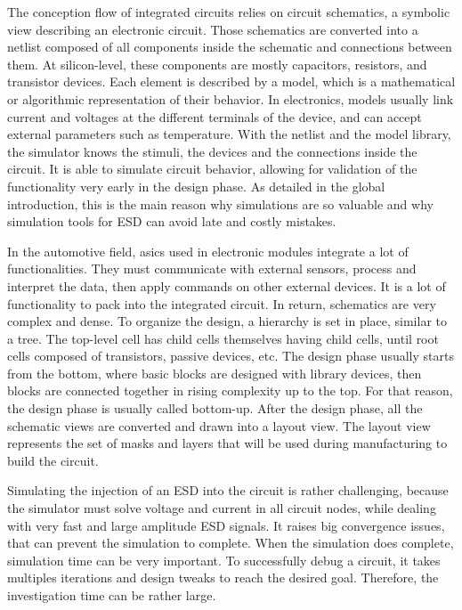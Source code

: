 The conception flow of integrated circuits relies on circuit schematics, a symbolic view describing an electronic circuit.
Those schematics are converted into a netlist composed of all components inside the schematic and connections between them.
At silicon-level, these components are mostly capacitors, resistors, and transistor devices.
Each element is described by a model, which is a mathematical or algorithmic representation of their behavior.
In electronics, models usually link current and voltages at the different terminals of the device, and can accept external parameters such as temperature.
With the netlist and the model library, the simulator knows the stimuli, the devices and the connections inside the circuit.
It is able to simulate circuit behavior, allowing for validation of the functionality very early in the design phase.
As detailed in the global introduction, this is the main reason why simulations are so valuable and why simulation tools for ESD can avoid late and costly mistakes.

In the automotive field, \gls{asic}s used in electronic modules integrate a lot of functionalities.
They must communicate with external sensors, process and interpret the data, then apply commands on other external devices.
It is a lot of functionality to pack into the integrated circuit.
In return, schematics are very complex and dense.
To organize the design, a hierarchy is set in place, similar to a tree.
The top-level cell has child cells themselves having child cells, until root cells composed of transistors, passive devices, etc.
The design phase usually starts from the bottom, where basic blocks are designed with library devices, then blocks are connected together in rising complexity up to the top.
For that reason, the design phase is usually called bottom-up.
After the design phase, all the schematic views are converted and drawn into a layout view.
The layout view represents the set of masks and layers that will be used during manufacturing to build the circuit.

Simulating the injection of an ESD into the circuit is rather challenging, because the simulator must solve voltage and current in all circuit nodes, while dealing with very fast and large amplitude ESD signals.
It raises big convergence issues, that can prevent the simulation to complete.
When the simulation does complete, simulation time can be very important.
To successfully debug a circuit, it takes multiples iterations and design tweaks to reach the desired goal.
Therefore, the investigation time can be rather large.

